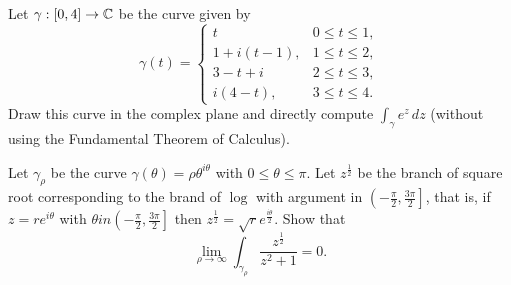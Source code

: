 \question Let $\gamma:[0,4] \to \mathbb{C}$ be the curve given by
\[
    \gamma(t) =
    \begin{cases}
        t & 0 \leq t \leq 1, \\
        1 + i(t - 1), & 1 \leq t \leq 2, \\
        3 - t + i & 2 \leq t \leq 3, \\
        i(4 - t), & 3 \leq t \leq 4. 
    \end{cases}
\]
Draw this curve in the complex plane and directly compute
$\int_\gamma e^z \,dz$
(without using the Fundamental Theorem of Calculus).

\question Let $\gamma_\rho$ be the curve 
$\gamma(\theta) = \rho \theta^{i\theta}$
with $0 \leq \theta \leq \pi$.
Let $z^{\frac12}$ be the branch of square root corresponding to the
brand of $\log$ with argument in
$\left(-\frac{\pi}2,\frac{3\pi}2\right]$,
that is, if $z = re^{i\theta}$ with
$\theta in \left(-\frac{\pi}2,\frac{3\pi}2\right]$
then
$z^{\frac12} = \sqrt r e^{\frac{i\theta}2}$.
Show that
\[
    \lim_{\rho \to \infty}
    \int_{\gamma_\rho}
    \frac{z^{\frac12}}{z^2 + 1} = 0.
\]
